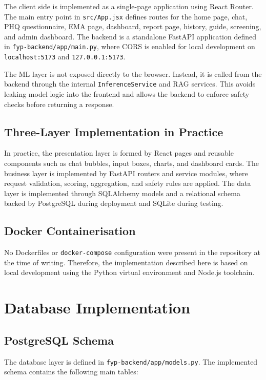 The client side is implemented as a single-page application using React Router. The main entry point in \texttt{src/App.jsx} defines routes for the home page, chat, PHQ questionnaire, EMA page, dashboard, report page, history, guide, screening, and admin dashboard. The backend is a standalone FastAPI application defined in \texttt{fyp-backend/app/main.py}, where CORS is enabled for local development on \texttt{localhost:5173} and \texttt{127.0.0.1:5173}.

The ML layer is not exposed directly to the browser. Instead, it is called from the backend through the internal \texttt{InferenceService} and RAG services. This avoids leaking model logic into the frontend and allows the backend to enforce safety checks before returning a response.

\subsection{Three-Layer Implementation in Practice}

In practice, the presentation layer is formed by React pages and reusable components such as chat bubbles, input boxes, charts, and dashboard cards. The business layer is implemented by FastAPI routers and service modules, where request validation, scoring, aggregation, and safety rules are applied. The data layer is implemented through SQLAlchemy models and a relational schema backed by PostgreSQL during deployment and SQLite during testing.

\subsection{Docker Containerisation}

No Dockerfiles or \texttt{docker-compose} configuration were present in the repository at the time of writing. Therefore, the implementation described here is based on local development using the Python virtual environment and Node.js toolchain.

\section{Database Implementation}

\subsection{PostgreSQL Schema}

The database layer is defined in \texttt{fyp-backend/app/models.py}. The implemented schema contains the following main tables:

